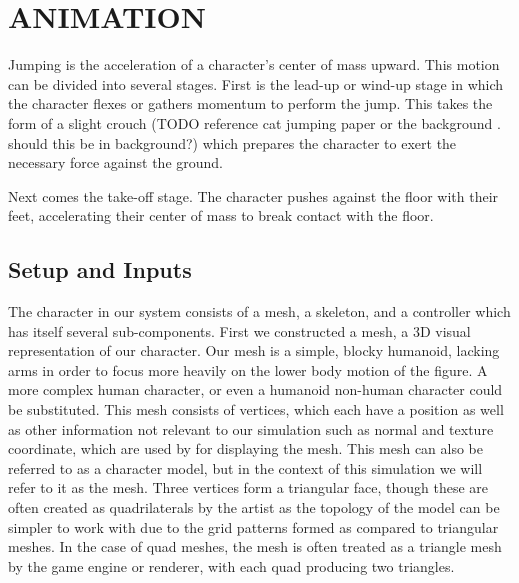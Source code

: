  
\chapter{ANIMATION}
\label{chapter:animation}

Jumping is the acceleration of a character's center of mass upward.  This motion can be divided into several stages.  First is the lead-up or wind-up stage in which the character flexes or gathers momentum to perform the jump.  This takes the form of a slight crouch (TODO reference cat jumping paper or the background .  should this be in background?) which prepares the character to exert the necessary force against the ground.  

Next comes the take-off stage.  The character pushes against the floor with their feet, accelerating their center of mass to break contact with the floor.  

\section{Setup and Inputs}
The character in our system consists of a mesh, a skeleton, and a controller which has itself several sub-components.  First we constructed a mesh, a 3D visual representation of our character.  Our mesh is a simple, blocky humanoid, lacking arms in order to focus more heavily on the lower body motion of the figure.  A more complex human character, or even a humanoid non-human character could be substituted.  This mesh consists of vertices, which each have a position as well as other information not relevant to our simulation such as normal and texture coordinate, which are used by \unity for displaying the mesh.  This mesh can also be referred to as a character model, but in the context of this simulation we will refer to it as the mesh.  Three vertices form a triangular face, though these are often created as quadrilaterals by the artist as the topology of the model can be simpler to work with due to the grid patterns formed as compared to triangular meshes.  In the case of quad meshes, the mesh is often treated as a triangle mesh by the game engine or renderer, with each quad producing two triangles.

